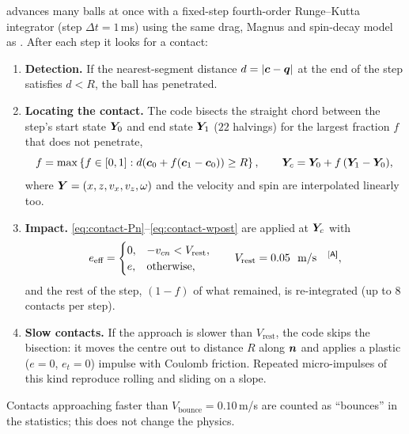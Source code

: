  advances many balls at once with a fixed-step fourth-order Runge--Kutta
integrator (step $\Delta t=1$\,\unit{ms}\assumed) using the same drag, Magnus and spin-decay
model as . After each step it looks for a contact:
\begin{enumerate}
  \item \textbf{Detection.} If the nearest-segment distance $d=|\bm{c}-\bm{q}|$ at the end
  of the step satisfies $d<R$, the ball has penetrated.
  \item \textbf{Locating the contact.} The code bisects the straight chord between the step's
  start state $\bm{Y}_0$ and end state $\bm{Y}_1$ ($22$\assumed{} halvings) for the
  largest fraction $f$ that does not penetrate,
  \begin{equation}
    f = \max\left\{ f\in[0,1] : d\!\left(\bm{c}_0 + f(\bm{c}_1-\bm{c}_0)\right)\ge R \right\},
    \qquad \bm{Y}_c = \bm{Y}_0 + f\,(\bm{Y}_1-\bm{Y}_0),
    \label{eq:contact-bisect}
  \end{equation}
  where $\bm{Y}=(x,z,v_x,v_z,\omega)$ and the velocity and spin are interpolated linearly too.
  \item \textbf{Impact.} \eqref{eq:contact-Pn}--\eqref{eq:contact-wpost} are applied at $\bm{Y}_c$ with
  \begin{equation}
    e_{\text{eff}} =
    \begin{cases}
      0, & -v_{cn} < V_{\text{rest}},\\
      e, & \text{otherwise},
    \end{cases}
    \qquad V_{\text{rest}} = 0.05\ \text{\unit{m/s}\assumed},
    \label{eq:contact-eeff}
  \end{equation}
  and the rest of the step, $(1-f)$ of what remained, is re-integrated (up to $8$\assumed{}
  contacts per step).
  \item \textbf{Slow contacts.} If the approach is slower than $V_{\text{rest}}$, the code skips
  the bisection: it moves the centre out to distance $R$ along $\bm{n}$ and applies a plastic
  ($e=0$, $e_t=0$) impulse with Coulomb friction. Repeated micro-impulses of this kind reproduce
  rolling and sliding on a slope.
\end{enumerate}
Contacts approaching faster than $V_{\text{bounce}}=0.10$\,\unit{m/s}\assumed{} are counted as
``bounces'' in the statistics; this does not change the physics.

